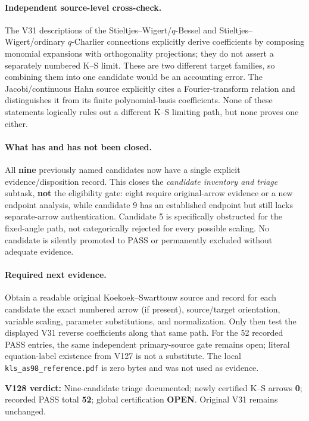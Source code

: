 \documentclass[11pt]{article}
\begin{document}
\paragraph{Independent source-level cross-check.} The V31 descriptions of the Stieltjes--Wigert/$q$-Bessel and Stieltjes--Wigert/ordinary $q$-Charlier connections explicitly derive coefficients by composing monomial expansions with orthogonality projections; they do not assert a separately numbered K--S limit. These are two different target families, so combining them into one candidate would be an accounting error. The Jacobi/continuous Hahn source explicitly cites a Fourier-transform relation and distinguishes it from its finite polynomial-basis coefficients. None of these statements logically rules out a different K--S limiting path, but none proves one either.

\paragraph{What has and has not been closed.} All \textbf{nine} previously named candidates now have a single explicit evidence/disposition record. This closes the \emph{candidate inventory and triage} subtask, \textbf{not} the eligibility gate: eight require original-arrow evidence or a new endpoint analysis, while candidate 9 has an established endpoint but still lacks separate-arrow authentication. Candidate 5 is specifically obstructed for the fixed-angle path, not categorically rejected for every possible scaling. No candidate is silently promoted to PASS or permanently excluded without adequate evidence.

\paragraph{Required next evidence.} Obtain a readable original Koekoek--Swarttouw source and record for each candidate the exact numbered arrow (if present), source/target orientation, variable scaling, parameter substitutions, and normalization. Only then test the displayed V31 reverse coefficients along that same path. For the 52 recorded PASS entries, the same independent primary-source gate remains open; literal equation-label existence from V127 is not a substitute. The local \texttt{kls\_as98\_reference.pdf} is zero bytes and was not used as evidence.

\noindent\textbf{V128 verdict:} Nine-candidate triage documented; newly certified K--S arrows \textbf{0}; recorded PASS total \textbf{52}; global certification \textbf{OPEN}. Original V31 remains unchanged.
\end{document}
